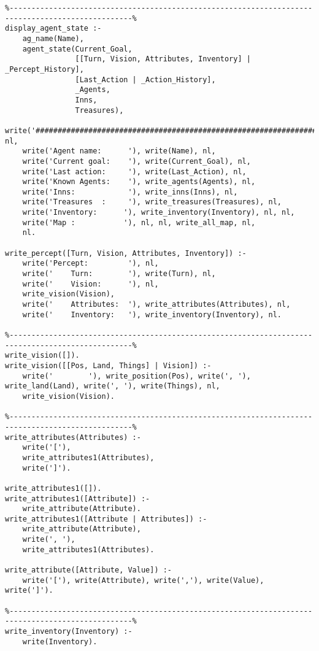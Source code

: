 \documentclass[a4paper,12pt]{report}
\begin{document}
\begin{scriptsize}
\begin{verbatim}
%--------------------------------------------------------------------------------------------------%
display_agent_state :-
    ag_name(Name),
    agent_state(Current_Goal, 
                [[Turn, Vision, Attributes, Inventory] | _Percept_History], 
                [Last_Action | _Action_History], 
                _Agents, 
                Inns, 
                Treasures),
    write('################################################################################'), nl, 
    write('Agent name:      '), write(Name), nl,
    write('Current goal:    '), write(Current_Goal), nl,
    write('Last action:     '), write(Last_Action), nl, 
    write('Known Agents:    '), write_agents(Agents), nl,
    write('Inns:            '), write_inns(Inns), nl,
    write('Treasures  :     '), write_treasures(Treasures), nl,
    write('Inventory:      '), write_inventory(Inventory), nl, nl, 
    write('Map :           '), nl, nl, write_all_map, nl, 
    nl. 

write_percept([Turn, Vision, Attributes, Inventory]) :-
    write('Percept:         '), nl, 
    write('    Turn:        '), write(Turn), nl, 
    write('    Vision:      '), nl,
    write_vision(Vision),
    write('    Attributes:  '), write_attributes(Attributes), nl, 
    write('    Inventory:   '), write_inventory(Inventory), nl.
    
%--------------------------------------------------------------------------------------------------%
write_vision([]).
write_vision([[Pos, Land, Things] | Vision]) :- 
    write('        '), write_position(Pos), write(', '), write_land(Land), write(', '), write(Things), nl, 
    write_vision(Vision).

%--------------------------------------------------------------------------------------------------%
write_attributes(Attributes) :-
    write('['), 
    write_attributes1(Attributes),
    write(']').

write_attributes1([]).
write_attributes1([Attribute]) :-
    write_attribute(Attribute).
write_attributes1([Attribute | Attributes]) :-
    write_attribute(Attribute), 
    write(', '),
    write_attributes1(Attributes).

write_attribute([Attribute, Value]) :-
    write('['), write(Attribute), write(','), write(Value), write(']').

%--------------------------------------------------------------------------------------------------%
write_inventory(Inventory) :-
    write(Inventory).


\end{verbatim}
\end{scriptsize}
\end{document}
